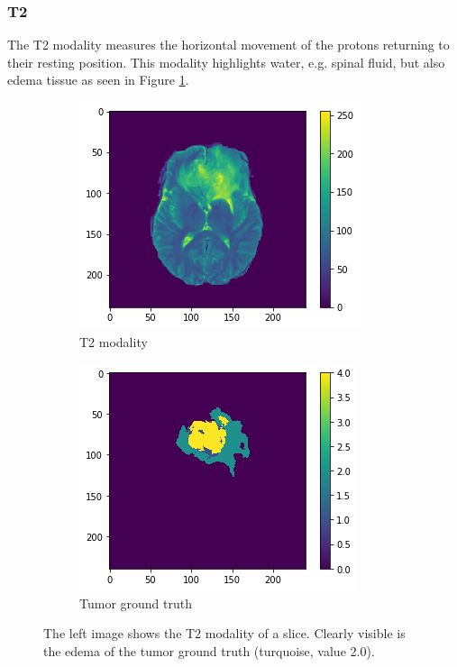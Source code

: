 \subsubsection{T2}
The T2 modality measures the horizontal movement of the protons returning to their resting position. This modality highlights water, e.g. spinal fluid, but also edema tissue as seen in Figure \ref{medical_background_t2}.
\begin{figure}[H]
    \centering
    \begin{subfigure}{.5\textwidth}
        \centering
        \includegraphics[width=\linewidth]{chapters/04_segmentation/images/medical_background/t2.png}
        \caption{T2 modality}
    \end{subfigure}%
    \begin{subfigure}{.5\textwidth}
        \centering
        \includegraphics[width=\linewidth]{chapters/04_segmentation/images/medical_background/tumor.png}
        \caption{Tumor ground truth}
    \end{subfigure}
    \caption{The left image shows the T2 modality of a slice. Clearly visible is the edema of the tumor ground truth (turquoise, value 2.0).}
    \label{medical_background_t2}
\end{figure}




